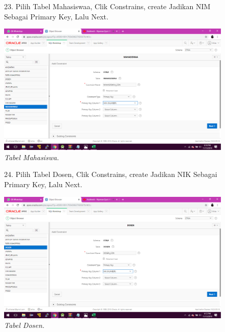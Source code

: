 \begin{enumerate}
\begin{figure}
\item[23.]Pilih Tabel Mahasiswaa, Clik Constrains, create Jadikan NIM Sebagai Primary Key, Lalu Next. 
    \begin{center}
    \includegraphics[scale=0.3]{figures/45.png}
    \caption{\textit{Tabel Mahasiswa.}}
    \end{center}
    \label{gambar}
    \end{figure}
    
\begin{figure}
\item[24.]Pilih Tabel Dosen, Clik Constrains, create Jadikan NIK Sebagai Primary Key, Lalu Next. 
    \begin{center}
    \includegraphics[scale=0.3]{figures/40.png}
    \caption{\textit{Tabel Dosen.}}
    \end{center}
    \label{gambar}
    \end{figure}


\end{enumerate}
